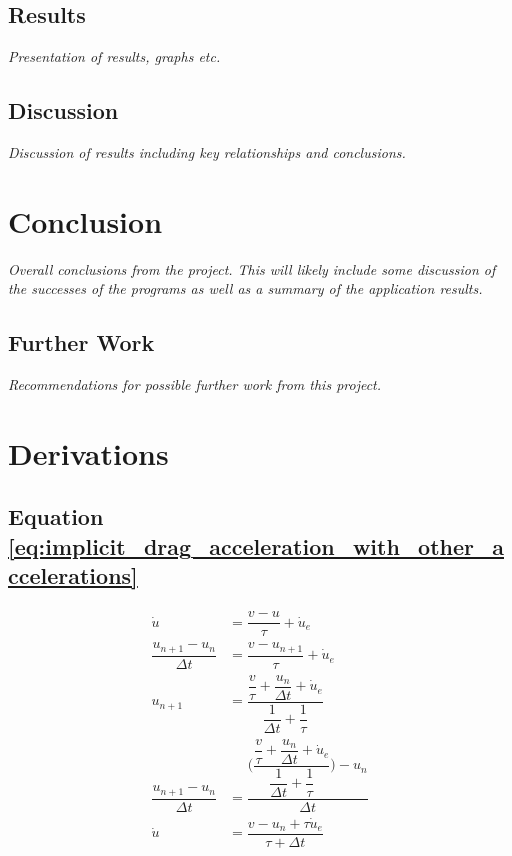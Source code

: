 \documentclass[10pt,a4paper,titlepage]{report}
\begin{document}
\section{Results}
\textit{Presentation of results, graphs etc.}
\section{Discussion}
\textit{Discussion of results including key relationships and conclusions.}
\chapter{Conclusion}
\textit{Overall conclusions from the project. This will likely include some discussion of the successes of the programs as well as a summary of the application results.}
\section{Further Work}
\textit{Recommendations for possible further work from this project.}
\appendix
\chapter{Derivations}
\label{ch:Derivations}
\section{Equation \ref{eq:implicit_drag_acceleration_with_other_accelerations}}
\label{sec:implicit_drag_accel_derivation}
\begin{align}
\dot{u} &= \dfrac{v - u}{\tau} + \dot{u}_{e}
\\\dfrac{u_{n+1} - u_{n}}{\Delta t} &= \dfrac{v - u_{n+1}}{\tau} + \dot{u}_{e}
\\u_{n+1} &= \dfrac{\dfrac{v}{\tau} + \dfrac{u_{n}}{\Delta t} + \dot{u}_{e}}{\dfrac{1}{\Delta t} + \dfrac{1}{\tau}}
\\\dfrac{u_{n+1} - u_{n}}{\Delta t} &= \dfrac{\Bigg(\dfrac{\dfrac{v}{\tau} + \dfrac{u_{n}}{\Delta t} + \dot{u}_{e}}{\dfrac{1}{\Delta t} + \dfrac{1}{\tau}}\Bigg) - u_{n}}{\Delta t}
\\\dot{u} &= \dfrac{v - u_{n} + \tau \dot{u}_{e}}{\tau + \Delta t}
\end{align}


\end{document}
